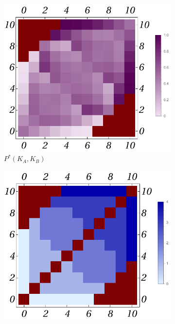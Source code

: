 \documentclass{article}
\theoremstyle{definition}
\begin{document}
\begin{figure}[H]
    \centering
    \begin{subfigure}[b]{0.3\textwidth}
        \includegraphics[width=\textwidth]{img/P_Plot_4_10.pdf}
        \caption{$P^*(K_A,K_B)$}
        \label{fig:sub1}
    \end{subfigure}
    \hfill %
    \begin{subfigure}[b]{0.3\textwidth}
        \includegraphics[width=\textwidth]{img/k_Plot_4_10.pdf}

\end{subfigure}
\end{figure}
\end{document}
